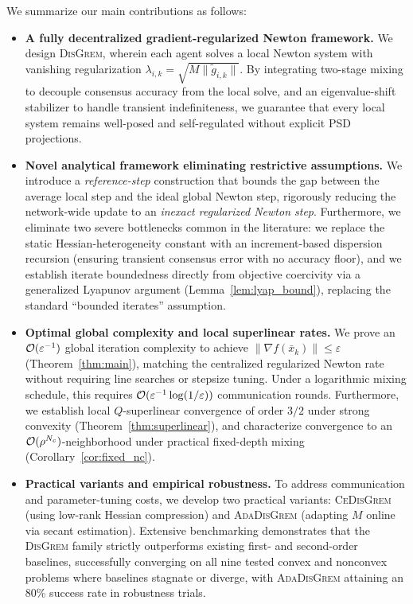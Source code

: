 \documentclass[review,onefignum,onetabnum]{siamart171218}
\begin{document}
We summarize our main contributions as follows:
\begin{itemize}[leftmargin=1.5em]
	\item \textbf{A fully decentralized gradient-regularized Newton framework.} We design \textsc{DisGrem}, wherein each agent solves a local Newton system with vanishing regularization $\lambda_{i,k}=\sqrt{M\|\tilde g_{i,k}\|}$. By integrating two-stage mixing to decouple consensus accuracy from the local solve, and an eigenvalue-shift stabilizer to handle transient indefiniteness, we guarantee that every local system remains well-posed and self-regulated without explicit PSD projections.
	
	\item \textbf{Novel analytical framework eliminating restrictive assumptions.} We introduce a \emph{reference-step} construction that bounds the gap between the average local step and the ideal global Newton step, rigorously reducing the network-wide update to an \emph{inexact regularized Newton step}. Furthermore, we eliminate two severe bottlenecks common in the literature: we replace the static Hessian-heterogeneity constant with an increment-based dispersion recursion (ensuring transient consensus error with no accuracy floor), and we establish iterate boundedness directly from objective coercivity via a generalized Lyapunov argument (Lemma~\ref{lem:lyap_bound}), replacing the standard ``bounded iterates'' assumption.
	
	\item \textbf{Optimal global complexity and local superlinear rates.} We prove an $\mathcal{O}(\varepsilon^{-1})$ global iteration complexity to achieve $\|\nabla f(\bar x_k)\|\le\varepsilon$ (Theorem~\ref{thm:main}), matching the centralized regularized Newton rate without requiring line searches or stepsize tuning. Under a logarithmic mixing schedule, this requires $\mathcal{O}(\varepsilon^{-1}\log(1/\varepsilon))$ communication rounds. Furthermore, we establish local $Q$-superlinear convergence of order $3/2$ under strong convexity (Theorem~\ref{thm:superlinear}), and characterize convergence to an $\mathcal{O}(\rho^{N_c})$-neighborhood under practical fixed-depth mixing (Corollary~\ref{cor:fixed_nc}).
	
	\item \textbf{Practical variants and empirical robustness.} To address communication and parameter-tuning costs, we develop two practical variants: \textsc{CeDisGrem} (using low-rank Hessian compression) and \textsc{AdaDisGrem} (adapting $M$ online via secant estimation). Extensive benchmarking demonstrates that the \textsc{DisGrem} family strictly outperforms existing first- and second-order baselines, successfully converging on all nine tested convex and nonconvex problems where baselines stagnate or diverge, with \textsc{AdaDisGrem} attaining an 80\% success rate in robustness trials.
\end{itemize}
\end{document}

